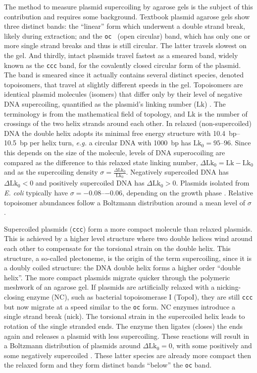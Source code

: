 \documentclass[10pt,a4]{article}
\def\cite#1{\hypersetup{citecolor=Teal}\citep{#1}} %
\newcommand{\lk}{\ensuremath{\text{Lk}}}
\newcommand{\lkr}{\ensuremath{\text{Lk}_0}}
\newcommand{\dlkr}{\ensuremath{\Delta\text{Lk}_0}}
\newcommand{\eg}{\textit{e.g.}}
\begin{document}
The method to measure plasmid supercoiling by agarose gels is the
subject of this contribution and requires some background.  Textbook
plasmid agarose gels show three distinct bands: the ``linear'' form
which underwent a double strand break, likely during extraction; and
the \texttt{oc } (open circular) band, which has only one or more
single strand breaks and thus is still circular. The latter travels
slowest on the gel. And thirdly, intact plasmids travel fastest as a
smeared band, widely known as the \texttt{ccc} band, for the
covalently closed circular form of the plasmid. The band is smeared
since it actually contains several distinct species, denoted
topoisomers, that travel at slightly different speeds in the gel.
%
Topoisomers are identical plasmid molecules (isomers) that differ only
by their level of negative DNA supercoiling, quantified as the
plasmid's linking number (\lk{}) \cite{Crick1976}. The terminology is
from the mathematical field of topology, and \lk{} is the number of
crossings of the two helix strands around each other.  In relaxed
(non-supercoiled) DNA the double helix adopts its minimal free energy
structure with \SIrange{10.4}{10.5}{bp} per helix turn, \eg{} a
circular DNA with \SI{1000}{bp} has $\lkr=\numrange{95}{96}$. Since
this depends on the size of the molecule, levels of DNA superocoiling
are compared as the difference to this relaxed state linking number,
$\dlkr=\lk-\lkr$ and as the supercoiling density
$\sigma=\frac{\dlkr}{\lkr}$.  Negatively supercoiled DNA has $\dlkr<0$
and positively supercoiled DNA has $\dlkr>0$.  Plasmids isolated from
\textit{E. coli} typically have $\sigma=\numrange{-0.08}{-0.06}$,
depending on the growth phase \cite{Liu2018}. Relative topoisomer
abundances follow a Boltzmann distribution around a mean level of
$\sigma$ \cite{Pulleyblank1975, Depew1975, Keller1975b}.

Supercoiled plasmids (\texttt{ccc}) form a more compact molecule than
relaxed plasmids. This is achieved by a higher level structure where
two double helices wind around each other to compensate for the
torsional strain on the double helix. This structure, a so-called
plectoneme, is the origin of the term supercoiling, since it is a
doubly coiled structure: the DNA double helix forms a higher order
``double helix''. The more compact plasmids migrate quicker through
the polymeric meshwork of an agarose gel.
%
If plasmids are artificially relaxed with a nicking-closing enzyme
(NC), such as bacterial topoisomerase I (TopoI), they are still
\texttt{ccc} but now migrate at a speed similar to the \texttt{oc}
form. NC enzymes introduce a single strand break (nick). The torsional
strain in the supercoiled helix leads to rotation of the single
stranded ends. The enzyme then ligates (closes) the ends again and
releases a plasmid with less supercoiling. These reactions will result
in a Boltzmann distribution of plasmids around $\dlkr=0$, with some
positively and some negatively supercoiled \cite{Depew1975}.  These
latter species are already more compact then the relaxed form and they
form distinct bands ``below'' the \texttt{oc} band.
\end{document}
